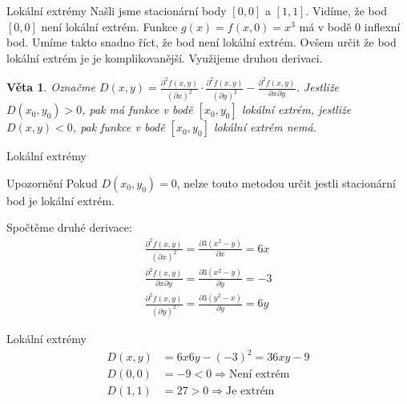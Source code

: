 \documentclass{beamer}
\newtheorem{thm}{Věta}
\theoremstyle{definition}
\theoremstyle{example}
\begin{document}
\begin{frame}{Lokální extrémy}
	Našli jsme stacionární body $[0, 0]$ a $[1, 1]$. Vidíme, že bod $[0, 0]$ není lokální extrém. Funkce $g(x) = f(x, 0) = x^3$ má v bodě 0 inflexní bod. Umíme takto snadno říct, že bod není lokální extrém. Ovšem určit že bod lokální extrém je je komplikovanější. Využijeme druhou derivaci.
	\begin{thm}
		Označme $D(x, y) = \frac{\partial^2f(x, y)}{(\partial x)^2} \cdot \frac{\partial^2f(x, y)}{(\partial y)^2 } - \frac{\partial^2 f(x, y)}{\partial x \partial y}$. Jestliže $D(x_0, y_0) > 0$, pak má funkce v bodě $[x_0, y_0]$ lokální extrém, jestliže $D(x, y) < 0$, pak funkce v bodě $[x_0, y_0]$ lokální extrém nemá.~{\normalfont \cite{hasil}}
	\end{thm}
\end{frame}

\begin{frame}{Lokální extrémy}
	\begin{alertblock}{Upozornění}
		Pokud $D(x_0, y_0) = 0$, nelze touto metodou určit jestli stacionární bod je lokální extrém.
	\end{alertblock}
	Spočtěme druhé derivace:
	\begin{align*}
		\frac{\partial^2f(x, y)}{(\partial x)^2} = \frac{\partial 3(x^2 - y)}{\partial x} = 6x\\
		\frac{\partial^2f(x, y)}{\partial x \partial y} = \frac{\partial 3(x^2 - y)}{\partial y} = -3\\
		\frac{\partial^2f(x, y)}{(\partial y)^2} = \frac{\partial 3(y^2 - x)}{\partial y} = 6y
	\end{align*}
\end{frame}

\begin{frame}{Lokální extrémy}
	\begin{align*}
		D(x, y) &= 6x6y - (-3)^2 = 36xy - 9\\
		D(0, 0) &= -9 < 0\Rightarrow \text{Není extrém}\\
		D(1, 1) &= 27 > 0 \Rightarrow \text{Je extrém}
	\end{align*}
\end{frame}
\end{document}
